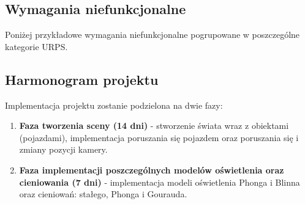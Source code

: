 \documentclass[11pt]{article}
\let\Oldsubsection\subsection
\renewcommand{\subsection}{\FloatBarrier\Oldsubsection}
\begin{document}
\subsection{Wymagania niefunkcjonalne}
Poniżej przykładowe wymagania niefunkcjonalne pogrupowane w poszczególne kategorie URPS.


\begin{center}

\begin{table}[!h]
\centering
\def\arraystretch{2}%
\caption{Lista wymagań niefunkcjonalnych}
\label{my-label}
\end{table}
\end{center}

\subsection{Harmonogram projektu}

\par Implementacja projektu zostanie podzielona na dwie fazy:
\begin{enumerate}
\item \textbf{Faza tworzenia sceny (14 dni)} - stworzenie świata wraz z obiektami (pojazdami), implementacja poruszania się pojazdem oraz poruszania się i zmiany pozycji kamery.
\item \textbf{Faza implementacji poszczególnych modelów oświetlenia oraz cieniowania (7 dni)} - implementacja modeli oświetlenia Phonga i Blinna oraz cieniowań: stałego, Phonga i Gourauda.
\end{enumerate}
\par \noindent
\end{document}
